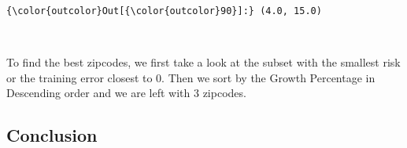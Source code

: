 \documentclass[11pt]{article}
\begin{document}
\begin{Verbatim}[commandchars=\\\{\}]
{\color{outcolor}Out[{\color{outcolor}90}]:} (4.0, 15.0)
\end{Verbatim}
            
    \begin{center}
    \end{center}
    { \hspace*{\fill} \\}
    
    To find the best zipcodes, we first take a look at the subset with the
smallest risk or the training error closest to 0. Then we sort by the
Growth Percentage in Descending order and we are left with 3 zipcodes.

    \subsection{Conclusion}\label{conclusion}
\end{document}
